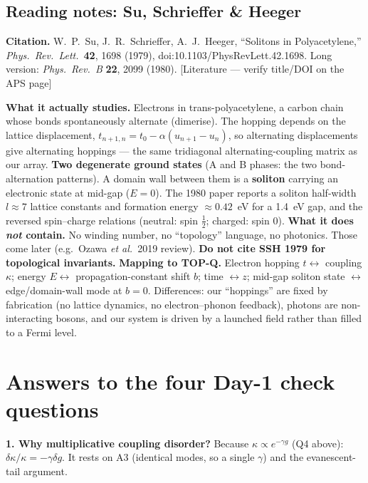 \documentclass[10pt,a4paper]{article}
\newcommand{\evd}[1]{\textsf{\small[#1]}}
\begin{document}
\subsection{Reading notes: Su, Schrieffer \& Heeger}
\textbf{Citation.} W.~P.~Su, J.~R.~Schrieffer, A.~J.~Heeger, ``Solitons in Polyacetylene,'' \emph{Phys.\ Rev.\ Lett.}\ \textbf{42}, 1698 (1979), doi:10.1103/PhysRevLett.42.1698. Long version: \emph{Phys.\ Rev.\ B} \textbf{22}, 2099 (1980). \evd{Literature --- verify title/DOI on the APS page}

\textbf{What it actually studies.} Electrons in trans-polyacetylene, a carbon chain whose bonds spontaneously alternate (dimerise). The hopping depends on the lattice displacement, $t_{n+1,n}=t_0-\alpha(u_{n+1}-u_n)$, so alternating displacements give alternating hoppings --- the same tridiagonal alternating-coupling matrix as our array.
\textbf{Two degenerate ground states} (A and B phases: the two bond-alternation patterns). A domain wall between them is a \textbf{soliton} carrying an electronic state at mid-gap ($E=0$). The 1980 paper reports a soliton half-width $l\approx7$ lattice constants and formation energy $\approx0.42$~eV for a 1.4~eV gap, and the reversed spin--charge relations (neutral: spin $\tfrac12$; charged: spin 0).
\textbf{What it does \emph{not} contain.} No winding number, no ``topology'' language, no photonics. Those come later (e.g.\ Ozawa \emph{et al.}\ 2019 review). \textbf{Do not cite SSH 1979 for topological invariants.}
\textbf{Mapping to TOP-Q.} Electron hopping $t\leftrightarrow$ coupling $\kappa$; energy $E\leftrightarrow$ propagation-constant shift $b$; time $\leftrightarrow z$; mid-gap soliton state $\leftrightarrow$ edge/domain-wall mode at $b=0$. Differences: our ``hoppings'' are fixed by fabrication (no lattice dynamics, no electron--phonon feedback), photons are non-interacting bosons, and our system is driven by a launched field rather than filled to a Fermi level.

\section{Answers to the four Day-1 check questions}
\textbf{1. Why multiplicative coupling disorder?} Because $\kappa\propto e^{-\gamma g}$ (Q4 above): $\delta\kappa/\kappa=-\gamma\delta g$. It rests on A3 (identical modes, so a single $\gamma$) and the evanescent-tail argument.
\end{document}
